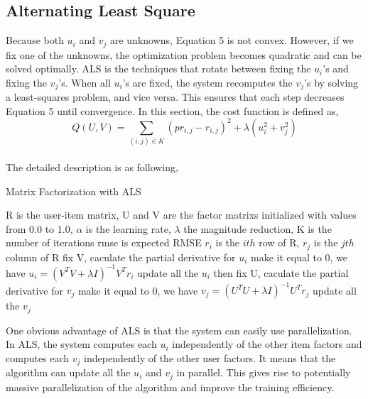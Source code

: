 \documentclass{sig-alternate-05-2015}
\begin{document}
\subsection{Alternating Least Square}
Because both $u_{i}$ and $v_{j}$ are unknowns, Equation 5 is not convex. However, if we fix one of the unknowns, the optimization problem becomes quadratic and can be solved optimally.
ALS is the techniques that rotate between fixing the  $u_{i}$'s and fixing the  $v_{j}$'s. When all  $u_{i}$'s are fixed, the system
recomputes the  $v_{j}$'s by solving a least-squares problem, and vice versa. This ensures that each step decreases Equation 5 until convergence. In this section, the cost function is defined as,\\
           \begin{equation}
     		Q(U, V)= {\sum\limits_{(i,j) \in K} {(pr_{i,j} - r_{i,j})}^{2} + \lambda(u_{i}^{2} + v_{j}^{2}) }
			\end{equation}
\\The detailed description is as following, \\
\begin{algorithm}
    \caption{Matrix Factorization with ALS}

    \begin{algorithmic}[2]
        \Require
            \Statex R is the user-item matrix,
            \Statex U and V are the factor matrixs initialized with values from 0.0 to 1.0,
            \Statex $\alpha$ is the learning rate,
            \Statex $\lambda$ the magnitude reduction,
            \Statex K is the number of iterations
            \Statex rmse is expected RMSE
            \Statex $r_i$ is the $ith$ row of R, $r_j$ is the $jth$ column of R
        \State fix V, caculate the partial derivative for $u_i$
        \State make it equal to 0, we have
        \State $u_i = (V^TV+ \lambda I)^{-1}V^Tr_i$
        \State update all the $u_i$
        \State then fix U, caculate the partial derivative for $v_j$
        \State make it equal to 0, we have
        \State $v_j = (U^TU+ \lambda I)^{-1}U^Tr_j$
        \State update all the $v_j$
    \EndFor
    \end{algorithmic}
\end{algorithm}

One obvious advantage of ALS is that the system can easily use parallelization. In ALS,
the system computes each $u_i$ independently of the other item factors and computes each $v_j$ independently of the other user factors.
It means that the algorithm can update all the $u_i$ and $v_j$ in parallel. This gives rise to potentially massive parallelization of the algorithm and improve the training efficiency.
\end{document}

